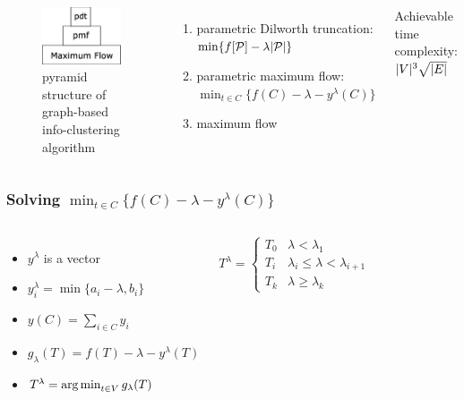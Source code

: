 \documentclass[notheorems]{beamer}
\begin{document}
\begin{frame}
\begin{columns}
\column{4cm}
\begin{figure}[!ht]
\centering
\includegraphics[width=4cm]{paper/pic/pdt.eps}
\caption{pyramid structure of graph-based info-clustering algorithm}\label{fig:ps}
\end{figure}
\column{6cm}
\begin{enumerate}
\item parametric Dilworth truncation: $\min \{f[\mathcal{P}] -\lambda \lvert\mathcal{P}\rvert\}$
\item parametric maximum flow: $\min_{t\in C} \{f(C) - \lambda - y^{\lambda}(C)\}$
\item maximum flow
\end{enumerate}
Achievable time complexity: $\lvert V\rvert^3 \sqrt{\lvert E\rvert}$
\end{columns}
\end{frame}
\begin{frame}
	\frametitle{Solving $\min_{t\in C} \{f(C) - \lambda - y^{\lambda}(C)\}$}
	\begin{columns}
    \column{5.3cm}
    \begin{itemize}
	\item $y^{\lambda}$ is a vector
	\item $y^{\lambda}_i = \min\{a_i - \lambda, b_i\}$ 
	\item $y(C) = \sum_{i \in C} y_i$	
	\item $g_{\lambda}(T) = f(T) - \lambda - y^{\lambda}(T)$
	\item $T^{\lambda} = \operatorname*{arg\,min}_{t\in V} g_{\lambda}(T)$
	\end{itemize}
	\begin{theorem}
		\begin{equation}\label{eq:Alambda}
			T^{\lambda}=\begin{cases}
				T_0 & \lambda < \lambda_1 \\
				T_i & \lambda_i \leq \lambda < \lambda_{i+1}\\
				T_k & \lambda \geq \lambda_{k}
			\end{cases}
		\end{equation}	
    \end{theorem}
	\column{4.7cm}
		
    \end{columns}
\end{frame}
\end{document}

